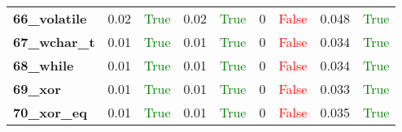 \documentclass{article}
\begin{document}
\begin{xltabular}{\textwidth}{lcccccccc}
\textbf{66\_volatile}& 0.02&\textcolor{green}{True}& 0.02&\textcolor{green}{True}& 0&\textcolor{red}{False}& 0.048&\textcolor{green}{True} \\[0.5ex]
\textbf{67\_wchar\_t}& 0.01&\textcolor{green}{True}& 0.01&\textcolor{green}{True}& 0&\textcolor{red}{False}& 0.034&\textcolor{green}{True} \\[0.5ex]
\textbf{68\_while}& 0.01&\textcolor{green}{True}& 0.01&\textcolor{green}{True}& 0&\textcolor{red}{False}& 0.034&\textcolor{green}{True} \\[0.5ex]
\textbf{69\_xor}& 0.01&\textcolor{green}{True}& 0.01&\textcolor{green}{True}& 0&\textcolor{red}{False}& 0.033&\textcolor{green}{True} \\[0.5ex]
\textbf{70\_xor\_eq}& 0.01&\textcolor{green}{True}& 0.01&\textcolor{green}{True}& 0&\textcolor{red}{False}& 0.035&\textcolor{green}{True} \\[0.5ex]
\bottomrule
\end{xltabular}
\newpage
\end{document}
